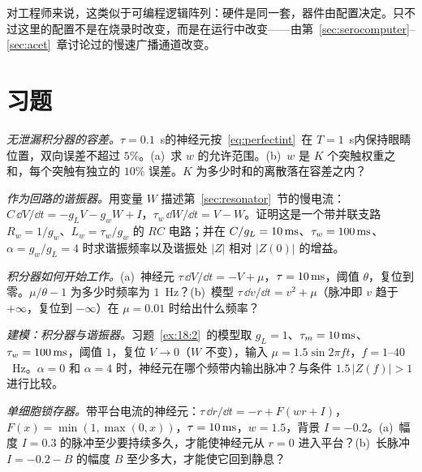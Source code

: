 对工程师来说，这类似于可编程逻辑阵列：硬件是同一套，器件由配置决定。只不过这里的配置不是在烧录时改变，而是在运行中改变——由第~\ref{sec:serocomputer}--\ref{sec:acet}~章讨论过的慢速广播通道改变。

\section{习题}

\begin{exercise}[\lvlA]
\label{ex:18:1}
\emph{无泄漏积分器的容差。}$\tau=0.1$~s的神经元按~\eqref{eq:perfectint}~在 $T=1$~s内保持眼睛位置，双向误差不超过 $5\%$。(a)~求 $w$ 的允许范围。(b)~$w$ 是 $K$ 个突触权重之和，每个突触有独立的 $10\%$ 误差。$K$ 为多少时和的离散落在容差之内？
\end{exercise}

\begin{exercise}[\lvlB]
\label{ex:18:2}
\emph{作为回路的谐振器。}用变量 $W$ 描述第~\ref{sec:resonator}~节的慢电流：$C\,\dd V/\dd t=-g_LV-g_wW+I$，$\tau_w\,\dd W/\dd t=V-W$。证明这是一个带并联支路 $R_w=1/g_w$、$L_w=\tau_w/g_w$ 的 $RC$ 电路；并在 $C/g_L=10\,\text{ms}$、$\tau_w=100\,\text{ms}$、$\alpha=g_w/g_L=4$ 时求谐振频率以及谐振处 $|Z|$ 相对 $|Z(0)|$ 的增益。
\end{exercise}

\begin{exercise}[\lvlB]
\label{ex:18:3}
\emph{积分器如何开始工作。}(a)~神经元 $\tau\,\dd V/\dd t=-V+\mu$，$\tau=10\,\text{ms}$，阈值 $\theta$，复位到零。$\mu/\theta-1$ 为多少时频率为 $1$~Hz？(b)~模型 $\tau\,\dd v/\dd t=v^2+\mu$（脉冲即 $v$ 趋于 $+\infty$，复位到 $-\infty$）在 $\mu=0.01$ 时给出什么频率？
\end{exercise}

\begin{exercise}[\lvlB]
\label{ex:18:4}
\emph{建模：积分器与谐振器。}习题~\ref{ex:18:2}~的模型取 $g_L=1$、$\tau_m=10\,\text{ms}$、$\tau_w=100\,\text{ms}$，阈值 $1$，复位 $V\to0$（$W$ 不变），输入 $\mu=1.5\sin2\pi ft$，$f=1$--$40$~Hz。$\alpha=0$ 和 $\alpha=4$ 时，神经元在哪个频带内输出脉冲？与条件 $1.5\,|Z(f)|>1$ 进行比较。
\end{exercise}

\begin{exercise}[\lvlB]
\label{ex:18:5}
\emph{单细胞锁存器。}带平台电流的神经元：$\tau\,\dd r/\dd t=-r+F(wr+I)$，$F(x)=\min(1,\max(0,x))$，$\tau=10\,\text{ms}$，$w=1.5$，背景 $I=-0.2$。(a)~幅度 $I=0.3$ 的脉冲至少要持续多久，才能使神经元从 $r=0$ 进入平台？(b)~长脉冲 $I=-0.2-B$ 的幅度 $B$ 至少多大，才能使它回到静息？
\end{exercise}

